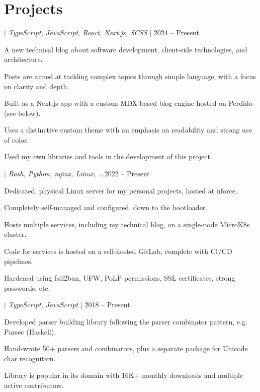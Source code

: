 \documentclass[a4paper,11pt]{article}
\begin{document}
\section{Projects}
\begin{sectionList}%
    \begin{project}{\textbf{\gregrosdev} $|$ \emph{TypeScript, JavaScript, React, Next.js, SCSS} $|$ \https{\mywebsite}}{2024 -- Present}
        \item A new technical blog about software development, client-side technologies, and architecture.
        \item Posts are aimed at tackling complex topics through simple language, with a focus on clarity and depth.
        \item Built as a Next.js app with a custom MDX-based blog engine hosted on Perdido (see below).
        \item Uses a distinctive custom theme with an emphasis on readability and strong use of color.
        \item Used my own libraries and tools in the development of this project.
    \end{project}
    \begin{project}{\textbf{\perdido} $|$ \emph{Bash, Python, nginx, Linux, ...}}{2022 -- Present}
        \item Dedicated, physical Linux server for my personal projects, hosted at nforce.
        \item Completely self-managed and configured, down to the bootloader.
        \item Hosts multiple services, including my technical blog, on a single-node MicroK8s cluster.
        \item Code for services is hosted on a self-hosted GitLab, complete with CI/CD pipelines.
        \item Hardened using fail2ban, UFW, PoLP permissions, SSL certificates, strong passwords, etc.
    \end{project}
    \begin{project}{\textbf{\parjs} $|$ \emph{TypeScript, JavaScript} $|$ }{2018 -- Present}
        \item Developed parser building library following the parser combinator pattern, e.g. Parsec (Haskell).
        \item Hand-wrote 50+ parsers and combinators, plus a separate package for Unicode char recognition.
        \item Library is popular in its domain with 16K+ monthly downloads and multiple active contributors.

\end{project}
\end{sectionList}
\end{document}
